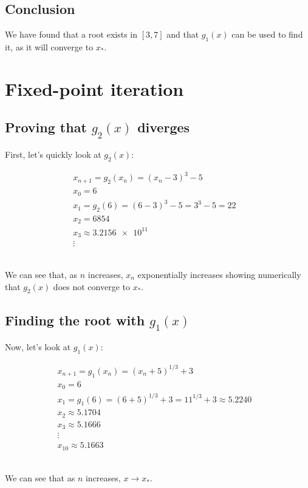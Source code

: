 \documentclass[../main.tex]{subfiles}
\begin{document}
    \subsection*{Conclusion}\label{subsec:fixed-point-conclusion}
    We have found that a root exists in $[3,7]$ and that $g_{1}(x)$ can be used to find it, as it will converge to $x_{*}$.

    \section{Fixed-point iteration}\label{sec:fixed_point_iteration}

    \subsection*{Proving that $g_{2}(x)$ diverges}\label{subsec:fixed-point-prove-g2-diverges}
    First, let's quickly look at $g_{2}(x)$:
    \begin{center*}
        \begin{align*}
            & x_{n+1} = g_{2}(x_{n}) = (x_{n} - 3)^{3} - 5 && \\
            & x_{0} = 6 && \\
            & x_{1} = g_{2}(6) = (6 - 3)^{3} - 5 = 3^{3} -5 = 22 && \\
            & x_{2} = 6854 && \\
            & x_{3} \approx \num{3.2156e11} && \\
            & \vdots &&
        \end{align*}
    \end{center*}\\
    We can see that, as $n$ increases, $x_{n}$ exponentially increases
    showing numerically that $g_{2}(x)$ does not converge to $x_{*}$.

    \subsection*{Finding the root with $g_{1}(x)$}\label{subsec:fixed-point-finding-root}
    Now, let's look at $g_{1}(x)$:
    \begin{center*}
        \begin{align*}
            & x_{n+1} = g_{1}(x_{n}) = (x_{n} + 5)^{1/3} + 3 && \\
            & x_{0} = 6 && \\
            & x_{1} = g_{1}(6) = (6 + 5)^{1/3} + 3 = 11^{1/3} + 3 \approx 5.2240 && \\
            & x_{2} \approx 5.1704 && \\
            & x_{3} \approx 5.1666 && \\
            & \vdots && \\
            & x_{10} \approx 5.1663 &&
        \end{align*}
    \end{center*}\\
    We can see that as $n$ increases, $x \to x_{*}$.
\end{document}
